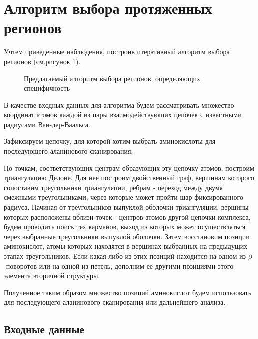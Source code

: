


\section{Алгоритм выбора протяженных регионов}
Учтем приведенные наблюдения, построив итеративный алгоритм выбора регионов (см.рисунок \ref{fig:algo_scheme}).
\begin{figure}
\resizebox{\linewidth}{!}{
\algoscheme
}
\caption{\small{Предлагаемый алгоритм выбора регионов, определяющих специфичность }}
\label{fig:algo_scheme}
\end{figure}
В качестве входных данных для алгоритма будем рассматривать множество координат атомов каждой из пары взаимодействующих цепочек с известными радиусами Ван-дер-Ваальса.

Зафиксируем цепочку, для которой хотим выбрать аминокислоты для последующего аланинового сканирования. 

По точкам, соответствующих центрам образующих эту цепочку атомов, построим триангуляцию Делоне. Для нее построим двойственный граф, вершинам которого сопоставим треугольники триангуляции, ребрам - переход между двумя смежными треугольниками, через которые может пройти  шар фиксированного радиуса. Начиная от треугольников выпуклой оболочки триангуляции, вершины которых расположены вблизи точек - центров атомов другой цепочки комплекса, будем проводить поиск тех карманов, выход из которых может осуществляться через выбранные треугольники выпуклой оболочки. Затем  восстановим позиции аминокислот, атомы которых находятся в вершинах выбранных на предыдущих этапах треугольников. Если какая-либо из этих позиций находится на одном из $\beta$-поворотов или на одной из петель, дополним ее другими позициями этого элемента вторичной структуры.   

Полученное таким образом множество позиций аминокислот будем использовать для последующего аланинового сканирования или дальнейшего анализа.

\subsection{Входные данные}

